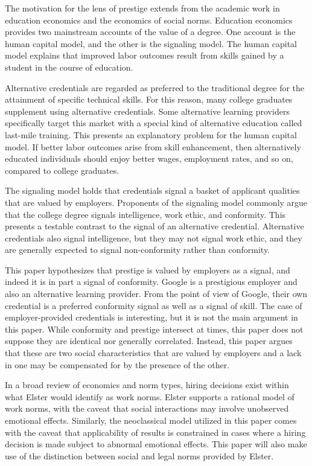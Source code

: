 \documentclass[review]{elsarticle}
\begin{document}
The motivation for the lens of prestige extends from the academic work in education economics and the economics of social norms.
Education economics provides two mainstream accounts of the value of a degree.
One account is the human capital model, and the other is the signaling model.
The human capital model explains that improved labor outcomes result from skills gained by a student in the course of education.

Alternative credentials are regarded as preferred to the traditional degree for the attainment of specific technical skills\cite{craig2018new}.
For this reason, many college graduates supplement using alternative credentials.
Some alternative learning providers specifically target this market with a special kind of alternative education called last-mile training.
This presents an explanatory problem for the human capital model.
If better labor outcomes arise from skill enhancement,
then alternatively educated individuals should enjoy better wages, employment rates, and so on,
compared to college graduates.

The signaling model holds that credentials signal a basket of applicant qualities that are valued by employers.
Proponents of the signaling model commonly argue that the college degree signals intelligence,
work ethic, and conformity\cite{caplan_2012}.
This presents a testable contrast to the signal of an alternative credential.
Alternative credentials also signal intelligence,
but they may not signal work ethic,
and they are generally expected to signal non-conformity rather than conformity.

This paper hypothesizes that prestige is valued by employers as a signal,
and indeed it is in part a signal of conformity.
Google is a prestigious employer and also an alternative learning provider.
From the point of view of Google, their own credential is a preferred conformity signal as well as a signal of skill.
The case of employer-provided credentials is interesting,
but it is not the main argument in this paper.
While conformity and prestige intersect at times,
this paper does not suppose they are identical nor generally correlated.
Instead, this paper argues that these are two social characteristics that are valued by employers
and a lack in one may be compensated for by the presence of the other.

In a broad review of economics and norm types, hiring decisions exist within what Elster would identify as work norms\cite{elster1989social}.
Elster supports a rational model of work norms, with the caveat that social interactions may involve unobserved emotional effects.
Similarly, the neoclassical model utilized in this paper comes with the caveat that
applicability of results is constrained in cases where a hiring decision is made subject to abnormal emotional effects.
This paper will also make use of the distinction between social and legal norms provided by Elster.
\end{document}
